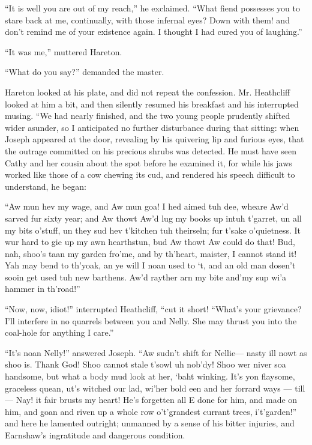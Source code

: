 \par “It is well you are out of my reach,” he exclaimed. “What fiend possesses you to stare back at me, continually, with those infernal eyes? Down with them! and don't remind me of your existence again. I thought I had cured you of laughing.”
\par “It was me,” muttered Hareton.
\par “What do you say?” demanded the master.
\par Hareton looked at his plate, and did not repeat the confession. Mr. Heathcliff looked at him a bit, and then silently resumed his breakfast and his interrupted musing. “We had nearly finished, and the two young people prudently shifted wider asunder, so I anticipated no further disturbance during that sitting: when Joseph appeared at the door, revealing by his quivering lip and furious eyes, that the outrage committed on his precious shrubs was detected. He must have seen Cathy and her cousin about the spot before he examined it, for while his jaws worked like those of a cow chewing its cud, and rendered his speech difficult to understand, he began:
\par “Aw mun hev my wage, and Aw mun goa! I hed aimed tuh dee, wheare Aw'd sarved fur sixty year; and Aw thowt Aw'd lug my books up intuh t'garret, un all my bits o'stuff, un they sud hev t'kitchen tuh theirseln; fur t'sake o'quietness. It wur hard to gie up my awn hearthstun, bud Aw thowt Aw could do that! Bud, nah, shoo's taan my garden fro'me, and by th'heart, maister, I cannot stand it! Yah may bend to th'yoak, an ye will I noan used to ‘t, and an old man dosen't sooin get used tuh new barthens. Aw'd rayther arn my bite and'my sup wi'a hammer in th'road!”
\par “Now, now, idiot!” interrupted Heathcliff, “cut it short! “What's your grievance? I'll interfere in no quarrels between you and Nelly. She may thrust you into the coal-hole for anything I care.”
\par “It's noan Nelly!” answered Joseph. “Aw sudn't shift for Nellie— nasty ill nowt as shoo is. Thank God! Shoo cannot stale t'sowl uh nob'dy! Shoo wer niver soa handsome, but what a body mud look at her, ‘baht winking. It's yon flaysome, graceless quean, ut's witched our lad, wi'her bold een and her forrard ways — till — Nay! it fair brusts my heart! He's forgetten all E done for him, and made on him, and goan and riven up a whole row o't'grandest currant trees, i't'garden!” and here he lamented outright; unmanned by a sense of his bitter injuries, and Earnshaw's ingratitude and dangerous condition.
